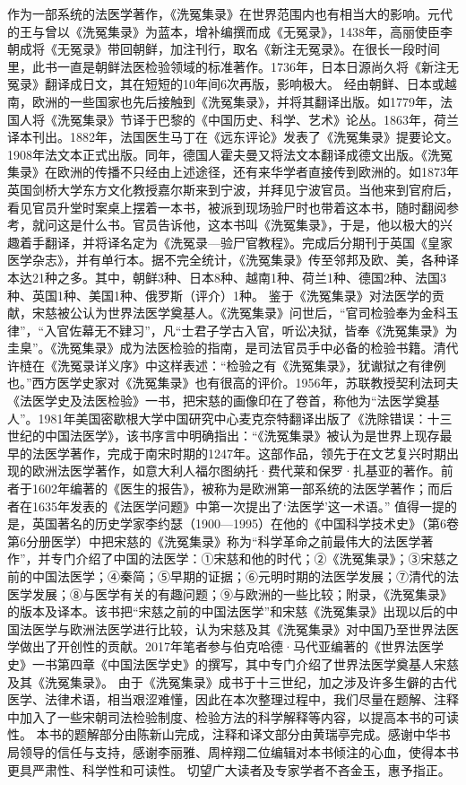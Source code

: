 \documentclass[12pt,UTF8]{ctexbook}
\begin{document}
作为一部系统的法医学著作，《洗冤集录》在世界范围内也有相当大的影响。元代的王与曾以《洗冤集录》为蓝本，增补编撰而成《无冤录》，1438年，高丽使臣李朝成将《无冤录》带回朝鲜，加注刊行，取名《新注无冤录》。在很长一段时间里，此书一直是朝鲜法医检验领域的标准著作。1736年，日本日源尚久将《新注无冤录》翻译成日文，其在短短的10年间6次再版，影响极大。
经由朝鲜、日本或越南，欧洲的一些国家也先后接触到《洗冤集录》，并将其翻译出版。如1779年，法国人将《洗冤集录》节译于巴黎的《中国历史、科学、艺术》论丛。1863年，荷兰译本刊出。1882年，法国医生马丁在《远东评论》发表了《洗冤集录》提要论文。1908年法文本正式出版。同年，德国人霍夫曼又将法文本翻译成德文出版。《洗冤集录》在欧洲的传播不只经由上述途径，还有来华学者直接传到欧洲的。如1873年英国剑桥大学东方文化教授嘉尔斯来到宁波，并拜见宁波官员。当他来到官府后，看见官员升堂时案桌上摆着一本书，被派到现场验尸时也带着这本书，随时翻阅参考，就问这是什么书。官员告诉他，这本书叫《洗冤集录》，于是，他以极大的兴趣着手翻译，并将译名定为《洗冤录—验尸官教程》。完成后分期刊于英国《皇家医学杂志》，并有单行本。据不完全统计，《洗冤集录》传至邻邦及欧、美，各种译本达21种之多。其中，朝鲜3种、日本8种、越南1种、荷兰1种、德国2种、法国3种、英国1种、美国1种、俄罗斯（评介）1种。
鉴于《洗冤集录》对法医学的贡献，宋慈被公认为世界法医学奠基人。《洗冤集录》问世后，“官司检验奉为金科玉律”，“入官佐幕无不肄习”，凡“士君子学古入官，听讼决狱，皆奉《洗冤集录》为圭臬”。《洗冤集录》成为法医检验的指南，是司法官员手中必备的检验书籍。清代许梿在《洗冤录详义序》中这样表述：“检验之有《洗冤集录》，犹谳狱之有律例也。”西方医学史家对《洗冤集录》也有很高的评价。1956年，苏联教授契利法珂夫《法医学史及法医检验》一书，把宋慈的画像印在了卷首，称他为“法医学奠基人”。1981年美国密歇根大学中国研究中心麦克奈特翻译出版了《洗除错误：十三世纪的中国法医学》，该书序言中明确指出：“《洗冤集录》被认为是世界上现存最早的法医学著作，完成于南宋时期的1247年。这部作品，领先于在文艺复兴时期出现的欧洲法医学著作，如意大利人福尔图纳托·费代莱和保罗·扎基亚的著作。前者于1602年编著的《医生的报告》，被称为是欧洲第一部系统的法医学著作；而后者在1635年发表的《法医学问题》中第一次提出了‘法医学’这一术语。”
值得一提的是，英国著名的历史学家李约瑟（1900—1995）在他的《中国科学技术史》（第6卷第6分册医学）中把宋慈的《洗冤集录》称为“科学革命之前最伟大的法医学著作”，并专门介绍了中国的法医学：①宋慈和他的时代；②《洗冤集录》；③宋慈之前的中国法医学；④秦简；⑤早期的证据；⑥元明时期的法医学发展；⑦清代的法医学发展；⑧与医学有关的有趣问题；⑨与欧洲的一些比较；附录，《洗冤集录》的版本及译本。该书把“宋慈之前的中国法医学”和宋慈《洗冤集录》出现以后的中国法医学与欧洲法医学进行比较，认为宋慈及其《洗冤集录》对中国乃至世界法医学做出了开创性的贡献。2017年笔者参与伯克哈德·马代亚编著的《世界法医学史》一书第四章《中国法医学史》的撰写，其中专门介绍了世界法医学奠基人宋慈及其《洗冤集录》。
由于《洗冤集录》成书于十三世纪，加之涉及许多生僻的古代医学、法律术语，相当艰涩难懂，因此在本次整理过程中，我们尽量在题解、注释中加入了一些宋朝司法检验制度、检验方法的科学解释等内容，以提高本书的可读性。
本书的题解部分由陈新山完成，注释和译文部分由黄瑞亭完成。感谢中华书局领导的信任与支持，感谢李丽雅、周梓翔二位编辑对本书倾注的心血，使得本书更具严肃性、科学性和可读性。
切望广大读者及专家学者不吝金玉，惠予指正。
\end{document}
